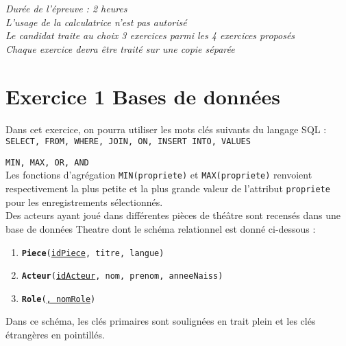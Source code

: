 \documentclass[a4paper,12pt,french]{book}
\begin{document}

    \begin{center}
        \Large
        \vspace{6cm}
        \textit{Durée de l'épreuve : 2 heures}\\[2em]

        \textit{L'usage de la calculatrice n'est pas autorisé}\\[2em]


        \textit{Le candidat traite au choix 3 exercices parmi les 4 exercices proposés}\\[2em]

        \textit{Chaque exercice devra être traité sur une copie séparée}
    \end{center}
    \newpage

    \section*{Exercice 1 \small{\hfill Bases de données}}

    Dans cet exercice, on pourra utiliser les mots clés suivants du langage \textsc{SQL} :\\

    \texttt{SELECT, FROM, WHERE, JOIN, ON, INSERT INTO, VALUES}

    \texttt{MIN, MAX, OR, AND}\\

    Les fonctions d’agrégation \texttt{MIN(propriete)} et \texttt{MAX(propriete)} renvoient respectivement
    la plus petite et la plus grande valeur de l’attribut \texttt{propriete} pour les enregistrements
    sélectionnés.\\

    Des acteurs ayant joué dans différentes pièces de théâtre sont recensés dans une base de
    données Theatre dont le schéma relationnel est donné ci-dessous :

    \begin{enumerate}[--]
        \item 	\texttt{\textbf{Piece}(\uline{idPiece}, titre, langue)}
        \item 	\texttt{\textbf{Acteur}(\uline{idActeur}, nom, prenom, anneeNaiss)}
        \item	\texttt{\textbf{Role}(\uline{, nomRole})}
    \end{enumerate}
    Dans ce schéma, les clés primaires sont soulignées en trait plein et les clés étrangères en pointillés.
\end{document}
